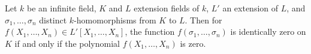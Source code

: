 Let $k$ be an infinite field, $K$ and $L$ extension fields of $k$, $L'$ an extension of $L$, and $\sigma_1, \ldots, \sigma_n$ distinct $k$-homomorphisms from $K$ to $L$. Then for $f(X_1, \ldots, X_n) \in L'[X_1, \ldots, X_n]$, the function $f(\sigma_1, \ldots, \sigma_n)$ is identically zero on $K$ if and only if the polynomial $f(X_1, \ldots, X_n)$ is zero.
